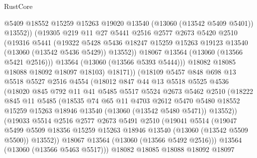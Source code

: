 \begin{lexlean}{RustCore}
\begin{coremodule}
                  @5409
                  @18552
                  @15259
                  @15263
                  @19020
                  @13540
                  (@13060 (@13542 @5409 @5401))
                  @13552))
              (@19305
                @219
                @11
                @27
                @5441
                @2516
                @2577
                @2673
                @5420
                @2510
                (@19316
                  @5441
                  (@19322
                    @5428
                    @5436
                    @18247
                    @15259
                    @15263
                    @19123
                    @13540
                    (@13060 (@13542 @5436 @5429))
                    @13552))
                @18067
                @13564
                (@13060 (@13566 @5421 @2516)))
              @13564
              (@13060 (@13566 @5393 @5444)))
            @18082
            @18085
            @18088
            @18092
            @18097
            @18103)
          @18171))
      (@18109
        @5457
        @848
        @698
        @13
        @5518
        @5527
        @2516
        @4554
        (@18012
          @847
          @44
          @13
          @5518
          @5525
          @4536
          (@18020
            @845
            @792
            @11
            @41
            @5485
            @5517
            @5524
            @2673
            @5462
            @2510
            (@18222
              @845
              @11
              @5485
              (@18535
                @74
                @65
                @11
                @4703
                @2612
                @5470
                @5480
                @18552
                @15259
                @15263
                @18946
                @13540
                (@13060 (@13542 @5480 @5471))
                @13552))
            (@19033
              @5514
              @2516
              @2577
              @2673
              @5491
              @2510
              (@19041
                @5514
                (@19047
                  @5499
                  @5509
                  @18356
                  @15259
                  @15263
                  @18946
                  @13540
                  (@13060 (@13542 @5509 @5500))
                  @13552))
              @18067
              @13564
              (@13060 (@13566 @5492 @2516)))
            @13564
            (@13060 (@13566 @5463 @5517)))
          @18082
          @18085
          @18088
          @18092
          @18097

\end{coremodule}
\end{lexlean}
